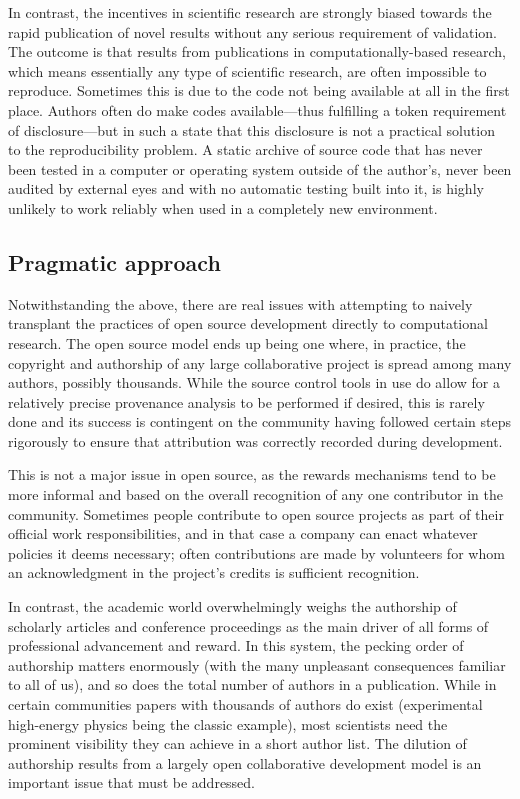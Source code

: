 \documentclass[ChapterTOCs,krantz2]{krantz} %
\begin{document}
In contrast, the incentives in scientific research are strongly
biased towards the rapid publication of novel results without any serious
requirement of validation. The outcome is that results from publications
in computationally-based research, which means essentially any type of
scientific research, are often impossible to reproduce. Sometimes
this is due to the code not being available at all in the first place.
Authors often do make codes available---thus fulfilling a token requirement
of disclosure---but in such a state that this disclosure is not a
practical solution to the reproducibility problem. A static archive
of source code that has never been tested in a computer or operating
system outside of the author's, never been audited by external eyes
and with no automatic testing built into it, is highly unlikely to
work reliably when used in a completely new environment.

\subsection{Pragmatic approach}

Notwithstanding the above, there are real issues with attempting to
naively transplant the practices of open source development directly
to computational research. The open source model ends up being one
where, in practice, the copyright and authorship of any large collaborative
project is spread among many authors, possibly thousands. While
the source control tools in use do allow for a relatively precise
provenance analysis to be performed if desired, this is rarely done
and its success is contingent on the community having followed certain
steps rigorously to ensure that attribution was correctly recorded
during development.

This is not a major issue in open source, as the rewards mechanisms
tend to be more informal and based on the overall recognition of any
one contributor in the community. Sometimes people contribute to open
source projects as part of their official work responsibilities, and
in that case a company can enact whatever policies it deems necessary;
often contributions are made by volunteers for whom an acknowledgment
in the project's credits is sufficient recognition.

In contrast, the academic world overwhelmingly weighs the authorship
of scholarly articles and conference proceedings as the main driver
of all forms of professional advancement and reward. In this system,
the pecking order of authorship matters enormously (with the many
unpleasant consequences familiar to all of us), and so does the total
number of authors in a publication. While in certain communities papers
with thousands of authors do exist (experimental high-energy physics
being the classic example), most scientists need the prominent visibility
they can achieve in a short author list. The dilution of authorship
results from a largely open collaborative development model
is an important issue that must be addressed.
\end{document}
